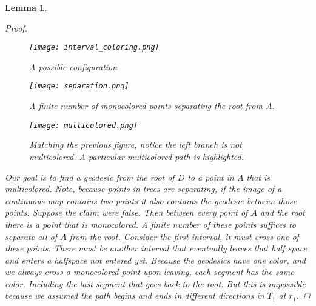 \documentclass[12pt,parskip=full]{report}
\theoremstyle{plain}
\newtheorem{lem}[thm]{Lemma}
\theoremstyle{definition}
\begin{document}
\begin{lem}
\begin{proof}
\begin{figure}[!h]
    \centering
    \texttt{[image: interval\_coloring.png]}
    \caption{A possible configuration}
    \label{fig:square}
\end{figure}
\begin{figure}[!h]
    \centering
    \texttt{[image: separation.png]}
    \caption{A finite number of monocolored points separating the root from $A$.}
    \label{fig:square}
\end{figure}
\begin{figure}[!h]
    \centering
    \texttt{[image: multicolored.png]}
    \caption{Matching the previous figure, notice the left branch is not multicolored. A particular multicolored path is highlighted.}
    \label{fig:square}
\end{figure}


        Our goal is to find a geodesic from the root of \(D\) to a point in \(A\) that is multicolored. Note, because points in trees are separating, if the image of a continuous map contains two points it also contains the geodesic between those points. Suppose the claim were false. Then between every point of \(A\) and the root there is a point that is monocolored. A finite number of these points suffices to separate all of \(A\) from the root. Consider the first interval, it must cross one of these points. There must be another interval that eventually leaves that half space and enters a halfspace not entered yet. Because the geodesics have one color, and we always cross a monocolored point upon leaving, each segment has the same color. Including the last segment that goes back to the root. But this is impossible because we assumed the path begins and ends in different directions in \(T_{1}\) at \(r_{1}\).

    \end{proof}
\end{lem}
\end{document}
